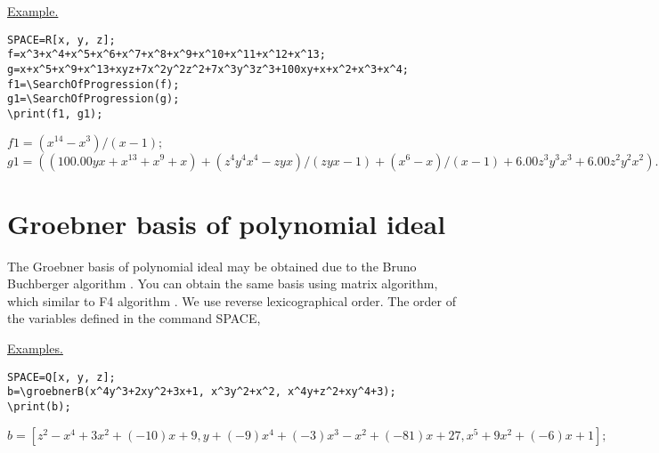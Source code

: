 \underline{Example. }

\vspace*{-2mm}
\begin{verbatim}
SPACE=R[x, y, z];
f=x^3+x^4+x^5+x^6+x^7+x^8+x^9+x^10+x^11+x^12+x^13;
g=x+x^5+x^9+x^13+xyz+7x^2y^2z^2+7x^3y^3z^3+100xy+x+x^2+x^3+x^4;
f1=\SearchOfProgression(f);
g1=\SearchOfProgression(g);
\print(f1, g1);
\end{verbatim}

{$f1 = (x^{14}-x^{3})/(x-1); $\\
\hspace*{4mm} $g1 = ((100. 00yx+x^{13}+x^{9}+x)+(z^{4}y^{4}x^{4}-zyx)/(zyx-1)+(x^{6}-x)/(x-1)+6. 00z^{3}y^{3}x^{3}+6. 00z^{2}y^{2}x^{2}). $}

\section{Groebner basis of polynomial ideal}  

 The Groebner basis of polynomial ideal may be obtained due to the Bruno Buchberger algorithm .
 You can obtain the same basis using matrix algorithm, which similar to F4 algorithm  .
We use reverse lexicographical order. The order of the variables defined in the command SPACE,


\underline{Examples. }

\vspace*{-2mm}
\begin{verbatim}
SPACE=Q[x, y, z]; 
b=\groebnerB(x^4y^3+2xy^2+3x+1, x^3y^2+x^2, x^4y+z^2+xy^4+3);  
\print(b);
\end{verbatim}

{$b = [z^2-x^4+3x^2+(-10)x+9, y+(-9)x^4+(-3)x^3-x^2+(-81)x+27, x^5+9x^2+(-6)x+1];$}


